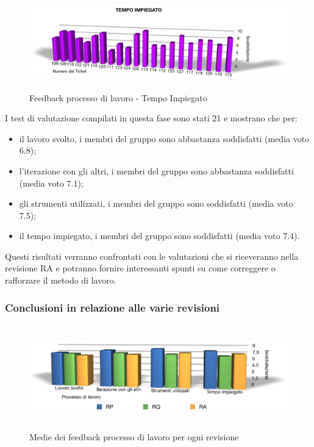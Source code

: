 \begin{figure}[htbp]
  \centering
  \includegraphics[height=4.1cm]{img/PQ/TempoImpiegato.png}
\caption{Feedback processo di lavoro - Tempo Impiegato}
\end{figure}

\newpage
I test di valutazione compilati in questa fase sono stati 21 e mostrano che
per:
\begin{itemize}
  \item il lavoro svolto, i membri del gruppo sono abbastanza
  soddisfatti (media voto 6.8);
  \item l'iterazione con gli altri, i membri del gruppo sono
  abbastanza soddisfatti (media voto 7.1);
  \item gli strumenti utilizzati, i membri del gruppo
  sono soddisfatti (media voto 7.5);
  \item il tempo impiegato, i membri del gruppo
  sono soddisfatti (media voto 7.4).\\
\end{itemize}

Questi risultati verranno confrontati con le valutazioni che si riceveranno
nella revisione RA e potranno fornire interessanti spunti su come correggere o
rafforzare il metodo di lavoro.

\subsubsection*{Conclusioni in relazione alle varie revisioni}

\begin{figure}[htbp]
  \centering
  \includegraphics[height=4.5cm]{img/PQ/RiassuntoFeedback.png}
\caption{Medie dei feedback processo di lavoro per ogni revisione}
\end{figure}

